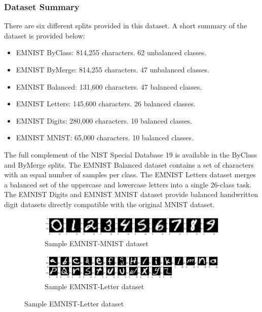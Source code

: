 \subsubsection{Dataset Summary}
There are six different splits provided in this dataset. A short summary of the dataset is provided below:
\begin{itemize}
  \item EMNIST ByClass: 814,255 characters. 62 unbalanced classes.
  \item EMNIST ByMerge: 814,255 characters. 47 unbalanced classes.
  \item EMNIST Balanced:  131,600 characters. 47 balanced classes.
  \item EMNIST Letters: 145,600 characters. 26 balanced classes.
  \item EMNIST Digits: 280,000 characters. 10 balanced classes.
  \item EMNIST MNIST: 65,000 characters. 10 balanced classes.
\end{itemize}
The full complement of the NIST Special Database 19 is available in the ByClass and ByMerge splits. The EMNIST Balanced dataset contains a set of characters with an equal number of samples per class.
The EMNIST Letters dataset merges a balanced set of the uppercase and lowercase letters into a single 26-class task. The EMNIST Digits and EMNIST MNIST dataset provide balanced handwritten digit datasets directly compatible with the original MNIST dataset.

\begin{figure}[htb!]
        \centering
        \begin{subfigure}[b]{\textwidth}
            \centering
            \includegraphics[width=\linewidth]{images/digit.png}
            \caption{Sample EMNIST-MNIST dataset}
            \label{fig:EMNIST MNIST dataset}
        \end{subfigure}%
        \label{fig:Rotate-misclassifications}
        \begin{subfigure}[b]{\textwidth}
            \centering
            \includegraphics[width=\linewidth]{images/letter.png}
            \caption{Sample EMNIST-Letter dataset}
            \label{fig:EMNIST MNIST dataset}
        \end{subfigure}%
        \label{fig:Rotate-misclassifications}
    \end{figure}
    \FloatBarrier

